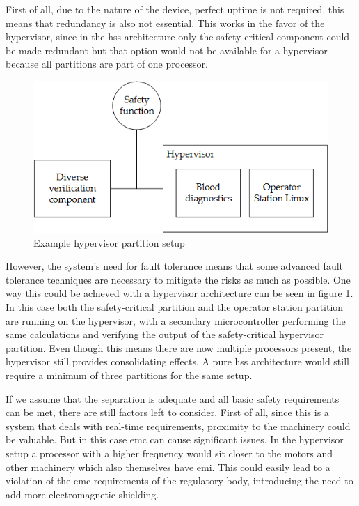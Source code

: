 First of all, due to the nature of the device, perfect uptime is not required, this means that redundancy is also not essential. This works in the favor of the hypervisor, since in the \acrshort{hss} architecture only the safety-critical component could be made redundant but that option would not be available for a hypervisor because all partitions are part of one processor. 

\begin{figure}
\centering
\includegraphics[scale=0.75]{Figures/blood_diagnostics_arch}
\decoRule
\caption{Example hypervisor partition setup}
\label{fig:blood_diagnostics_hv_arch}
\end{figure}

However, the system's need for fault tolerance means that some advanced fault tolerance techniques are necessary to mitigate the risks as much as possible. One way this could be achieved with a hypervisor architecture can be seen in figure \ref{fig:blood_diagnostics_hv_arch}. In this case both the safety-critical partition and the operator station partition are running on the hypervisor, with a secondary microcontroller performing the same calculations and verifying the output of the safety-critical hypervisor partition. Even though this means there are now multiple processors present, the hypervisor still provides consolidating effects. A pure \acrshort{hss} architecture would still require a minimum of three partitions for the same setup.

If we assume that the separation is adequate and all basic safety requirements can be met, there are still factors left to consider. First of all, since this is a system that deals with real-time requirements, proximity to the machinery could be valuable. But in this case \acrshort{emc} can cause significant issues. In the hypervisor setup a processor with a higher frequency would sit closer to the motors and other machinery which also themselves have \acrshort{emi}. This could easily lead to a violation of the \acrshort{emc} requirements of the regulatory body, introducing the need to add more electromagnetic shielding. 

